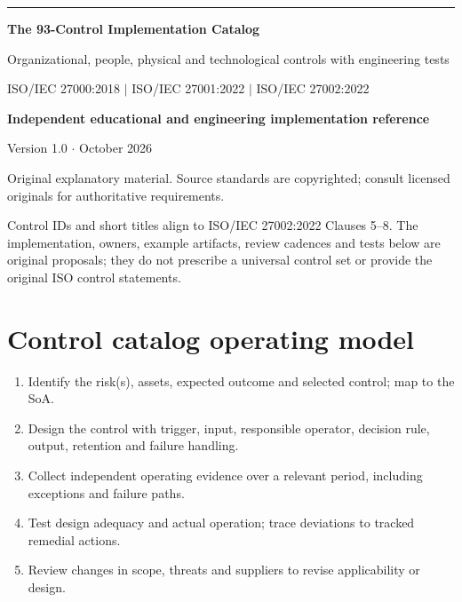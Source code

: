 \documentclass[11pt,letterpaper]{article}
\begin{document}
\hypersetup{pageanchor=false}%
\begin{titlepage}
\vspace*{1.2in}
{\color{teal}\rule{\textwidth}{4pt}}\par\vspace{20pt}
{\Huge\bfseries\color{navy} The 93-Control Implementation Catalog}\par\vspace{18pt}
{\Large\color{graytext} Organizational, people, physical and technological controls with engineering tests}\par\vspace{1.3in}
{\large ISO/IEC 27000:2018 $\vert$ ISO/IEC 27001:2022 $\vert$ ISO/IEC 27002:2022}\par
\vfill
\textbf{Independent educational and engineering implementation reference}\par
Version 1.0 $\cdot$ October 2026\par
{\small Original explanatory material. Source standards are copyrighted; consult licensed originals for authoritative requirements.}\par
\end{titlepage}\hypersetup{pageanchor=true}
\tableofcontents\clearpage{}
\begin{tcolorbox}[title={Usage and authority},colback=pale,colframe=teal,breakable]
\SourceTag Control IDs and short titles align to ISO/IEC 27002:2022 Clauses 5--8. \EngineeringTag The implementation, owners, example artifacts, review cadences and tests below are original proposals; they do not prescribe a universal control set or provide the original ISO control statements.
\end{tcolorbox}
\section{Control catalog operating model}
\begin{enumerate}
\item Identify the risk(s), assets, expected outcome and selected control; map to the SoA.
\item Design the control with trigger, input, responsible operator, decision rule, output, retention and failure handling.
\item Collect independent operating evidence over a relevant period, including exceptions and failure paths.
\item Test design adequacy and actual operation; trace deviations to tracked remedial actions.
\item Review changes in scope, threats and suppliers to revise applicability or design.
\end{enumerate}
\end{document}
